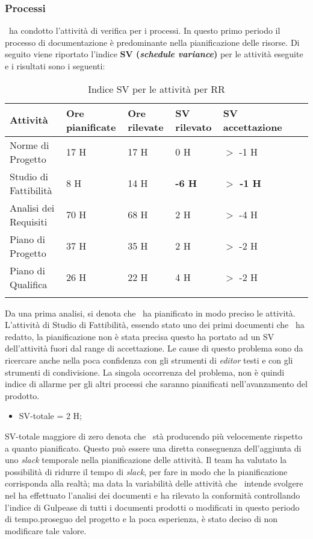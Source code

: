 \subsubsection{Processi}
\gruppo ~ha condotto l'attività di verifica per i processi. In questo primo periodo il processo di documentazione è predominante nella pianificazione delle risorse. Di seguito viene riportato l'indice \textbf{SV (\textit{schedule variance})} per le attività eseguite e i risultati sono i seguenti:
\begin{longtable}{lllllXr}
\toprule
\textbf{Attività} & \textbf{Ore pianificate} & \textbf{Ore rilevate} & \textbf{SV rilevato} & \textbf{SV accettazione} \\
\toprule
Norme di Progetto & 17 H & 17 H & 0 H & $>$ -1 H\\
\midrule
Studio di Fattibilità & 8 H & 14 H & \textbf{-6 H} & \textbf{$>$ -1 H}\\
\midrule
Analisi dei Requisiti & 70 H & 68 H & 2 H & $>$ -4 H\\
\midrule
Piano di Progetto & 37 H & 35 H & 2 H & $>$ -2 H\\
\midrule
Piano di Qualifica & 26 H & 22 H & 4 H & $>$ -2 H\\
\bottomrule
\caption{Indice SV per le attività per RR}
\end{longtable}
Da una prima analisi, si denota che \gruppo ~ha pianificato in modo preciso le attività.
L'attività di Studio di Fattibilità, essendo stato uno dei primi documenti che \gruppo ~ha redatto, la pianificazione non è stata precisa questo ha portato ad un SV dell'attività fuori dal range di accettazione. Le cause di questo problema sono da ricercare anche nella poca confidenza con gli strumenti di \textit{editor} testi e con gli strumenti di condivisione. La singola occorrenza del problema, non è quindi indice di allarme per gli altri processi che saranno pianificati nell'avanzamento del prodotto.
\begin{itemize}
\item SV-totale = 2 H;
\end{itemize}
SV-totale maggiore di zero denota che \gruppo ~stà producendo più velocemente rispetto a quanto pianificato. Questo può essere una diretta conseguenza dell'aggiunta di uno \textit{slack} temporale nella pianificazione delle attività.
Il team ha valutato la possibilità di ridurre il tempo di \textit{slack}, per fare in modo che la pianificazione corrisponda alla realtà; ma data la variabilità delle attività che \gruppo ~intende svolgere nel \gruppo ha effettuato l'analisi dei documenti e ha rilevato la conformità controllando l'indice di Gulpease di tutti i documenti prodotti o modificati in questo periodo di tempo.proseguo del progetto e la poca esperienza, è stato deciso di non modificare tale valore.\\
